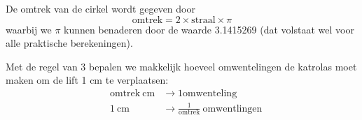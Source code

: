 \documentclass[a4paper, 10pt]{article}
\begin{document}
De omtrek van de cirkel wordt gegeven door
\begin{equation}
\mathrm{omtrek} = 2 \times \mathrm{straal} \times \pi
\end{equation}
waarbij we $\pi$ kunnen benaderen door de waarde 3.1415269 (dat volstaat wel voor alle praktische berekeningen).

Met de regel van 3 bepalen we makkelijk hoeveel omwentelingen de katrolas moet maken om de lift 1 cm te verplaatsen:
\begin{align}
& \mathrm{omtrek}\ \mathrm{cm} & \rightarrow 1 \mathrm{omwenteling}\\
& 1\ \mathrm{cm}               & \rightarrow \frac{1}{\mathrm{omtrek}}\ \mathrm{omwentlingen}
\end{align}
\end{document}
